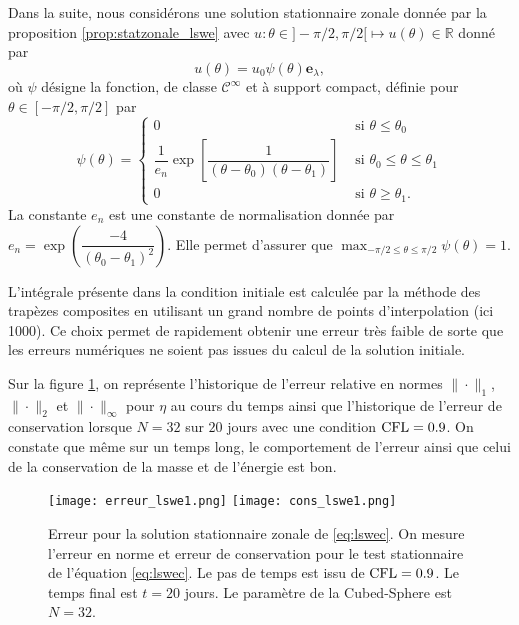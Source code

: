 Dans la suite, nous considérons une solution stationnaire zonale donnée par la proposition \ref{prop:statzonale_lswe} avec $u : \theta \in ]-\pi/2,\pi/2[ \mapsto u(\theta) \in \mathbb{R}$ donné par
\begin{equation}
u(\theta) = u_0 \psi(\theta) \mathbf{e}_{\lambda},
\end{equation}
où $\psi$ désigne la fonction, de classe $\mathcal{C}^{\infty}$ et à support compact, définie pour $\theta \in [-\pi/2, \pi/2]$ par
\begin{equation}
\psi(\theta) = \left\lbrace
\begin{array}{ll}
0 & \text{ si } \theta \leq \theta_0 \\
\dfrac{1}{e_n} \exp \left[ \dfrac{1}{(\theta-\theta_0)(\theta- \theta_1)} \right] & \text{ si } \theta_0 \leq \theta \leq \theta_1 \\
0 & \text{ si } \theta \geq \theta_1.
\end{array}
\right.
\label{eq:psi_supcompact}
\end{equation}
La constante $e_n$ est une constante de normalisation donnée par $e_n = \exp \left( \dfrac{-4}{(\theta_0 - \theta_1)^2} \right)$. Elle permet d'assurer que $\max_{- \pi/2 \leq \theta \leq \pi/2} \psi(\theta) = 1$.

L'intégrale présente dans la condition initiale est calculée par la méthode des trapèzes composites en utilisant un grand nombre de points d'interpolation (ici 1000). Ce choix permet de rapidement obtenir une erreur très faible de sorte que les erreurs numériques ne soient pas issues du calcul de la solution initiale.

Sur la figure \ref{fig:lswec_hist}, on représente l'historique de l'erreur relative en normes $\| \cdot \|_1$, $\| \cdot \|_2$ et $\| \cdot \|_{\infty}$ pour $\eta$ au cours du temps ainsi que l'historique de l'erreur de conservation lorsque $N=32$ sur $20$ jours avec une condition $\text{CFL} = 0.9$. On constate que même sur un temps long, le comportement de l'erreur ainsi que celui de la conservation de la masse et de l'énergie est bon.

\begin{figure}[htbp]
\begin{center}
\texttt{[image: erreur\_lswe1.png]}
\texttt{[image: cons\_lswe1.png]}
\end{center}
\caption{Erreur pour la solution stationnaire zonale de \eqref{eq:lswec}. On mesure l'erreur en norme et erreur de conservation pour le test stationnaire de l'équation \eqref{eq:lswec}. Le pas de temps est issu de $\text{CFL}=0.9$. Le temps final est $t=20$ jours. Le paramètre de la Cubed-Sphere est $N=32$.}
\label{fig:lswec_hist}
\end{figure}

